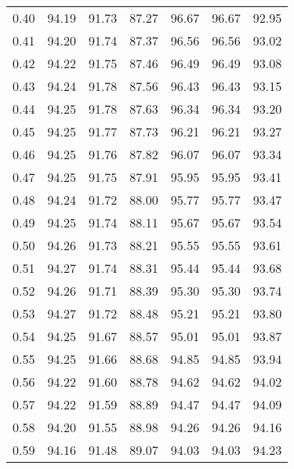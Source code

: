 \begin{tabular}{|c|c|c|c|c|c|c|}
      0.40 &     94.19 &     91.73 &      87.27 &   96.67 &      96.67 &         92.95 \\
      0.41 &     94.20 &     91.74 &      87.37 &   96.56 &      96.56 &         93.02 \\
      0.42 &     94.22 &     91.75 &      87.46 &   96.49 &      96.49 &         93.08 \\
      0.43 &     94.24 &     91.78 &      87.56 &   96.43 &      96.43 &         93.15 \\
      0.44 &     94.25 &     91.78 &      87.63 &   96.34 &      96.34 &         93.20 \\
      0.45 &     94.25 &     91.77 &      87.73 &   96.21 &      96.21 &         93.27 \\
      0.46 &     94.25 &     91.76 &      87.82 &   96.07 &      96.07 &         93.34 \\
      0.47 &     94.25 &     91.75 &      87.91 &   95.95 &      95.95 &         93.41 \\
      0.48 &     94.24 &     91.72 &      88.00 &   95.77 &      95.77 &         93.47 \\
      0.49 &     94.25 &     91.74 &      88.11 &   95.67 &      95.67 &         93.54 \\
      0.50 &     94.26 &     91.73 &      88.21 &   95.55 &      95.55 &         93.61 \\
      0.51 &     94.27 &     91.74 &      88.31 &   95.44 &      95.44 &         93.68 \\
      0.52 &     94.26 &     91.71 &      88.39 &   95.30 &      95.30 &         93.74 \\
      0.53 &     94.27 &     91.72 &      88.48 &   95.21 &      95.21 &         93.80 \\
      0.54 &     94.25 &     91.67 &      88.57 &   95.01 &      95.01 &         93.87 \\
      0.55 &     94.25 &     91.66 &      88.68 &   94.85 &      94.85 &         93.94 \\
      0.56 &     94.22 &     91.60 &      88.78 &   94.62 &      94.62 &         94.02 \\
      0.57 &     94.22 &     91.59 &      88.89 &   94.47 &      94.47 &         94.09 \\
      0.58 &     94.20 &     91.55 &      88.98 &   94.26 &      94.26 &         94.16 \\
      0.59 &     94.16 &     91.48 &      89.07 &   94.03 &      94.03 &         94.23 \\

\end{tabular}
